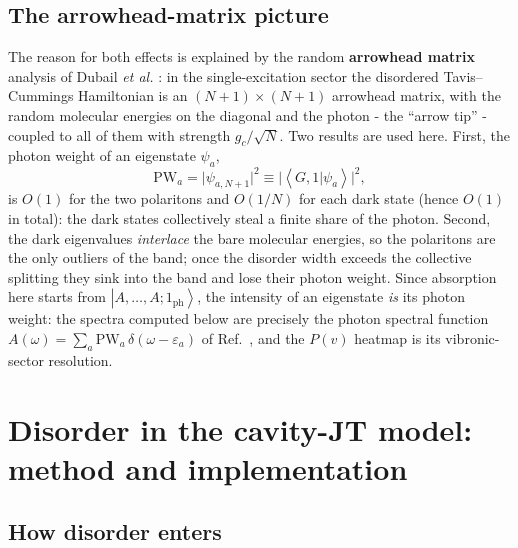 \documentclass[12pt,a4paper]{article}
\newcommand{\ket}[1]{\left|#1\right\rangle}
\newcommand{\braket}[1]{\left\langle#1\right\rangle}
\begin{document}
\subsection{The arrowhead-matrix picture}

The reason for both effects is explained by the random
\textbf{arrowhead matrix} analysis of Dubail \emph{et al.} \cite{Dubail2021}:
in the single-excitation sector the disordered Tavis--Cummings Hamiltonian is
an $(N{+}1)\times(N{+}1)$ arrowhead matrix, with the random molecular energies
on the diagonal and the photon - the ``arrow tip'' - coupled to all of them
with strength $g_c/\sqrt N$. Two results are used here. First, the photon
weight of an eigenstate $\psi_a$,
\begin{equation}
  \mathrm{PW}_a=\big|\psi_{a,N+1}\big|^2\equiv
  \big|\braket{G,1|\psi_a}\big|^2,
  \label{eq:PW}
\end{equation}
is $O(1)$ for the two polaritons and $O(1/N)$ for each dark state (hence
$O(1)$ in total): the dark states collectively steal a finite share of the
photon. Second, the dark eigenvalues \emph{interlace} the bare molecular
energies, so the polaritons are the only outliers of the band; once the
disorder width exceeds the collective splitting they sink into the band and
lose their photon weight. Since absorption here starts from
$\ket{A,\dots,A;1_{\mathrm{ph}}}$, the intensity of an eigenstate \emph{is} its
photon weight: the spectra computed below are precisely the photon spectral
function $A(\omega)=\sum_a\mathrm{PW}_a\,\delta(\omega-\varepsilon_a)$ of
Ref.~\cite{Dubail2021}, and the $P(v)$ heatmap is its vibronic-sector
resolution.

\section{Disorder in the cavity-JT model: method and implementation}
\label{sec:method}

\subsection{How disorder enters}
\end{document}
